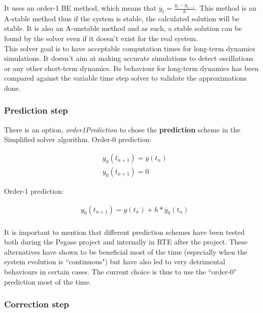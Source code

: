 \documentclass[a4paper, 12pt]{report}
\begin{document}
It uses an order-1 \ac{BE} method, which means that $\dot{y_t} = \frac{y_t - y_{t-1}}{h}$. This method is an A-stable method thus if the system is stable, the calculated solution will be stable. It is also an A-unstable method and as such, a stable solution can be found by the solver even if it doesn't exist for the real system. \\

This solver goal is to have acceptable computation times for long-term dynamics simulations. It doesn't aim at making accurate simulations to detect oscillations or any other short-term dynamics. Its behaviour for long-term dynamics has been compared against the variable time step solver to validate the approximations done. \\

\subsubsection{Prediction step}

There is an option, \textit{order1Prediction} to chose the \textbf{prediction} scheme in the Simplified solver  algorithm. Order-0 prediction:

\begin{equation}
\begin{aligned}
& y_0(t_{n+1}) = y(t_n) \\
& \dot{y_0}(t_{n+1}) = 0
\end{aligned}
\end{equation}

Order-1 prediction:

\begin{equation}
\begin{aligned}
& y_0(t_{n+1}) = y(t_n) + h * \dot{y_0}(t_{n}) \\
\end{aligned}
\end{equation}

It is important to mention that different prediction schemes have been tested both during the Pegase project and internally in RTE after the project. These alternatives have shown to be beneficial most of the time (especially when the system evolution is ``continuous") but have also led to very detrimental behaviours in certain cases. The current choice is thus to use the ``order-0" prediction most of the time.

\subsubsection{Correction step}
\end{document}
